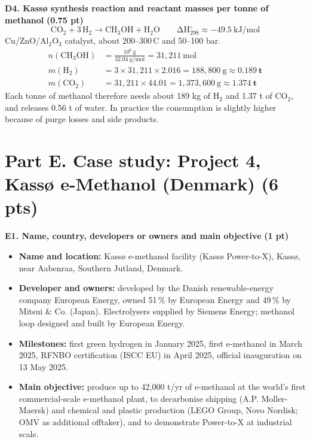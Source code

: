 \documentclass[11pt,a4paper]{article}
\newcommand{\degC}{\,\textdegree C}
\newcommand{\pts}[1]{\hfill{\normalsize\textbf{(#1)}}}
\newcommand{\rxn}[1]{\[\mathrm{#1}\]}
\begin{document}
\textbf{D4. Kassø synthesis reaction and reactant masses per tonne of methanol} \pts{0.75 pt}
\rxn{CO_2 + 3\,H_2 \longrightarrow CH_3OH + H_2O \qquad \Delta H^\circ_{298} \approx -49.5\ kJ/mol}
Cu/ZnO/Al$_2$O$_3$ catalyst, about 200--300\degC{} and 50--100 bar.
\begin{align*}
n(\mathrm{CH_3OH}) &= \frac{10^6\ \mathrm{g}}{32.04\ \mathrm{g/mol}} = 31{,}211\ \mathrm{mol}\\
m(\mathrm{H_2}) &= 3 \times 31{,}211 \times 2.016 = 188{,}800\ \mathrm{g} \approx \mathbf{0.189\ t}\\
m(\mathrm{CO_2}) &= 31{,}211 \times 44.01 = 1{,}373{,}600\ \mathrm{g} \approx \mathbf{1.374\ t}
\end{align*}
Each tonne of methanol therefore needs about 189 kg of H$_2$ and 1.37 t of CO$_2$, and releases 0.56 t of water.
In practice the consumption is slightly higher because of purge losses and side products.

\section{Part E. Case study: Project 4, Kassø e-Methanol (Denmark) \pts{6 pts}}

\textbf{E1. Name, country, developers or owners and main objective} \pts{1 pt}
\begin{itemize}
  \item \textbf{Name and location:} Kassø e-methanol facility (Kassø Power-to-X), Kassø, near Aabenraa, Southern
        Jutland, Denmark.
  \item \textbf{Developer and owners:} developed by the Danish renewable-energy company European Energy, owned
        51\,\% by European Energy and 49\,\% by Mitsui \& Co. (Japan). Electrolysers supplied by Siemens Energy;
        methanol loop designed and built by European Energy.
  \item \textbf{Milestones:} first green hydrogen in January 2025, first e-methanol in March 2025, RFNBO
        certification (ISCC EU) in April 2025, official inauguration on 13 May 2025.
  \item \textbf{Main objective:} produce up to 42,000 t/yr of e-methanol at the world's first commercial-scale
        e-methanol plant, to decarbonise shipping (A.P. Moller-Maersk) and chemical and plastic production
        (LEGO Group, Novo Nordisk; OMV as additional offtaker), and to demonstrate Power-to-X at industrial scale.
\end{itemize}
\end{document}
